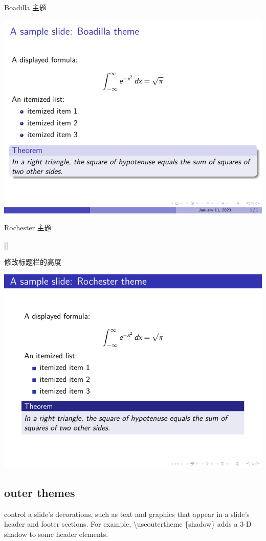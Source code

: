 \begin{column}{0.5\textwidth}
Boadilla 主题

\includegraphics{examples/beamer/theme-boadilla.pdf}

Rochester 主题

||

修改标题栏的高度

\includegraphics{examples/beamer/theme-rochester.pdf}

\subsection{outer themes}

control a slide’s decorations, such as text and graphics that appear in a slide’s header and footer sections. For example, {\ttfamily \textbackslash useoutertheme \{shadow\}} adds a 3-D shadow to some header elements.


\end{column}
